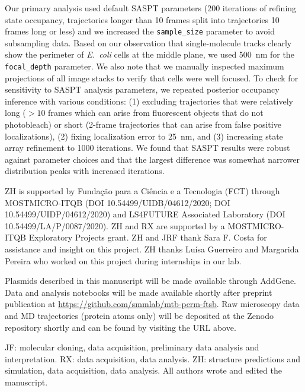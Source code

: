 \documentclass[twocolumn,pdflatex,sn-nature]{sn-jnl}%
\newcommand\ec{\textit{E.~coli}}
\begin{document}
Our primary analysis used default SASPT parameters (200 iterations of refining state occupancy, trajectories longer than 10 frames split into trajectories 10 frames long or less) and we increased the \verb|sample_size| parameter to avoid subsampling data.
Based on our observation that single-molecule tracks clearly show the perimeter of \ec{} cells at the middle plane, we used \qty{500}{\nm} for the \verb|focal_depth| parameter.
We also note that we manually inspected maximum projections of all image stacks to verify that cells were well focused.
To check for sensitivity to SASPT analysis parameters, we repeated posterior occupancy inference with various conditions: (1) excluding trajectories that were relatively long ($>10$ frames which can arise from fluorescent objects that do not photobleach) or short (2-frame trajectories that can arise from false positive localizations), (2) fixing localization error to \qty{25}{\nm}, and (3) increasing state array refinement to \num{1000} iterations.
We found that SASPT results were robust against parameter choices and that the largest difference was somewhat narrower distribution peaks with increased iterations.

\backmatter


ZH is supported by Fundação para a Ciência e a Tecnologia (FCT) through MOSTMICRO-ITQB (DOI 10.54499/UIDB/04612/2020; DOI 10.54499/UIDP/04612/2020) and LS4FUTURE Associated Laboratory (DOI 10.54499/LA/P/0087/2020).
ZH and RX are supported by a MOSTMICRO-ITQB Exploratory Projects grant.
ZH and JRF thank Sara F. Costa for assistance and insight on this project.
ZH thanks Luísa Guerreiro and Margarida Pereira who worked on this project during internships in our lab.


Plasmids described in this manuscript will be made available through AddGene.
Data and analysis notebooks will be made available shortly after preprint publication at \url{https://github.com/smmlab/mtb-perm-ftsb}.
Raw microscopy data and MD trajectories (protein atoms only) will be deposited at the Zenodo repository shortly and can be found by visiting the URL above.


JF: molecular cloning, data acquisition, preliminary data analysis and interpretation. RX: data acquisition, data analysis. ZH: structure predictions and simulation, data acquisition, data analysis. All authors wrote and edited the manuscript.
\end{document}
